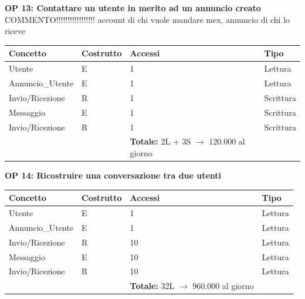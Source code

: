 \documentclass[a4paper,12pt]{report}
\begin{document}
            \textbf{OP 13: Contattare un utente in merito ad un annuncio creato}
            COMMENTO!!!!!!!!!!!!!!!!! account di chi vuole mandare mex, annuncio di chi lo riceve
        	\begin{table}[H]
            \centering
             \begin{tabular}{llll}
             \rowcolor{yellow!20} \textbf{Concetto} & \textbf{Costrutto} & \textbf{Accessi} & \textbf{Tipo}\\ [0.5ex] 
             \hline
             Utente & E & 1 & Lettura \\ 
             Annuncio\_Utente & E & 1 & Lettura \\ 
             Invio/Ricezione & R & 1 & Scrittura \\ 
             Messaggio & E & 1 & Scrittura \\ 
             Invio/Ricezione & R & 1 & Scrittura \\ 
             \hline
                \rowcolor{yellow!20} &   & \textbf{Totale:} 2L + 3S $\rightarrow$ 120.000 al giorno &  \\ [1ex] 
             
             \end{tabular}
            \end{table}

            \textbf{OP 14: Ricostruire una conversazione tra due utenti}
        	\begin{table}[H]
            \centering
             \begin{tabular}{llll}
             \rowcolor{yellow!20} \textbf{Concetto} & \textbf{Costrutto} & \textbf{Accessi} & \textbf{Tipo}\\ [0.5ex] 
             \hline
             Utente & E & 1 & Lettura \\ 
             Annuncio\_Utente & E & 1 & Lettura \\ 
             Invio/Ricezione & R & 10 & Lettura \\ 
             Messaggio & E & 10 & Lettura \\ 
             Invio/Ricezione & R & 10 & Lettura \\ 
             \hline
                \rowcolor{yellow!20} &   & \textbf{Totale:} 32L $\rightarrow$ 960.000 al giorno &  \\ [1ex] 
             
             \end{tabular}
            \end{table}
\end{document}
